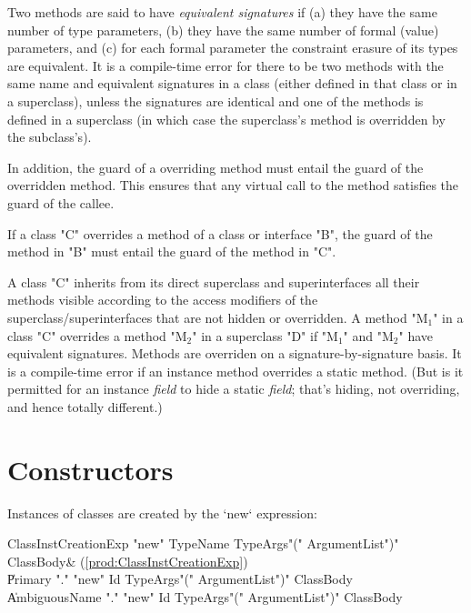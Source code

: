  Two methods are said to have {\em equivalent signatures} if (a) they have the
 same number of type parameters, 
(b) they have the same number of formal (value) parameters, and (c)
for each formal parameter the constraint erasure of its types are equivalent.
It is a 
compile-time error for there to be two methods with the same name and
equivalent signatures in a class (either defined in that class or in a
superclass), unless the signatures are identical and one of the methods is
defined in a superclass (in which case the superclass's method is overridden
by the subclass's).

 



In addition, the guard of a overriding method
must entail
the guard of the overridden method.   This
ensures that any virtual call to the method
satisfies the guard of the callee.


  If a class \xcd"C" overrides a method of a class or interface
  \xcd"B", the guard of the method in \xcd"B" must entail
  the guard of the method in \xcd"C".


A class \xcd"C" inherits from its direct superclass and superinterfaces all
their methods visible according to the access modifiers
of the superclass/superinterfaces that are not hidden or overridden. A method \xcdmath"M$_1$" in a class
\xcd"C" overrides
a method \xcdmath"M$_2$" in a superclass \xcd"D" if
\xcdmath"M$_1$" and \xcdmath"M$_2$" have equivalent signatures.
Methods are overriden on a signature-by-signature basis.  It is a compile-time
error if an instance method overrides a static method.  (But is it permitted
for an instance {\em field} to hide a static {\em field}; that's hiding, not
overriding, and hence totally different.)

\section{Constructors}
\label{sect:constructors}

Instances of classes are created by the \xcd`new` expression: \\
\begin{bbgrammar}
ClassInstCreationExp \: \xcd"new" TypeName TypeArgs\opt \xcd"(" ArgumentList\opt \xcd")" ClassBody\opt & (\ref{prod:ClassInstCreationExp}) \\
                     \| Primary \xcd"." \xcd"new" Id TypeArgs\opt \xcd"(" ArgumentList\opt \xcd")" ClassBody\opt \\
                     \| AmbiguousName \xcd"." \xcd"new" Id TypeArgs\opt \xcd"(" ArgumentList\opt \xcd")" ClassBody\opt \\
\end{bbgrammar}

